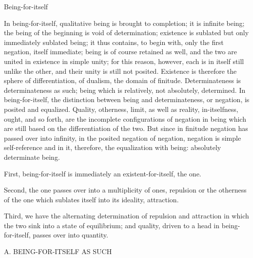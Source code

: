 Being-for-itself

In being-for-itself,
qualitative being is brought to completion;
it is infinite being;
the being of the beginning is void of determination;
existence is sublated but only immediately sublated being;
it thus contains, to begin with,
only the first negation, itself immediate;
being is of course retained as well,
and the two are united in existence in simple unity;
for this reason, however, each is in itself still unlike the other,
and their unity is still not posited.
Existence is therefore the sphere of differentiation,
of dualism, the domain of finitude.
Determinateness is determinateness as such;
being which is relatively, not absolutely, determined.
In being-for-itself, the distinction
between being and determinateness,
or negation, is posited and equalized.
Quality, otherness, limit, as well as reality, in-itselfness,
ought, and so forth, are the incomplete configurations of negation in being
which are still based on the differentiation of the two.
But since in finitude negation has passed over into infinity,
in the posited negation of negation,
negation is simple self-reference
and in it, therefore, the equalization with being:
absolutely determinate being.

First, being-for-itself is immediately
an existent-for-itself, the one.

Second, the one passes over into a multiplicity of ones,
repulsion or the otherness of the one
which sublates itself into its ideality, attraction.

Third, we have the alternating
determination of repulsion and attraction
in which the two sink into a state of equilibrium;
and quality, driven to a head in being-for-itself,
passes over into quantity.

A. BEING-FOR-ITSELF AS SUCH

